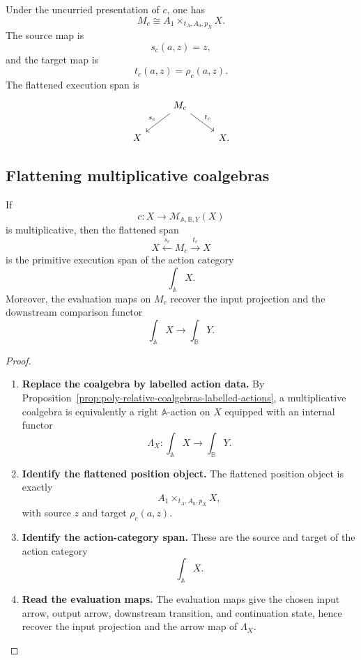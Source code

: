 Under the uncurried presentation of \(c\), one has
\[
M_c\cong A_1\times_{t_A,A_0,p_X}X.
\]
The source map is
\[
s_c(a,z)=z,
\]
and the target map is
\[
t_c(a,z)=\rho_c(a,z).
\]
The flattened execution span is
\[
\begin{tikzcd}
&
M_c
  \arrow[dl,"s_c"']
  \arrow[dr,"t_c"]
&
\\
X && X .
\end{tikzcd}
\]

\subsection{Flattening multiplicative coalgebras}
\label{subsec:poly-relative-flattening-multiplicative}

\begin{theorem}
\label{thm:poly-relative-flattening-multiplicative}
If
\[
c:X\to\mathcal M_{\mathbb A,\mathbb B,Y}(X)
\]
is multiplicative, then the flattened span
\[
X\xleftarrow{s_c}M_c\xrightarrow{t_c}X
\]
is the primitive execution span of the action category
\[
\int_{\mathbb A}X.
\]
Moreover, the evaluation maps on \(M_c\) recover the input projection and the
downstream comparison functor
\[
\int_{\mathbb A}X\to\int_{\mathbb B}Y.
\]
\end{theorem}

\begin{proof}
\leavevmode
\begin{enumerate}
\item \textbf{Replace the coalgebra by labelled action data.}
By Proposition~\ref{prop:poly-relative-coalgebras-labelled-actions}, a
multiplicative coalgebra is equivalently a right \(\mathbb A\)-action on
\(X\) equipped with an internal functor
\[
\Lambda_X:\int_{\mathbb A}X\to\int_{\mathbb B}Y.
\]

\item \textbf{Identify the flattened position object.}
The flattened position object is exactly
\[
A_1\times_{t_A,A_0,p_X}X,
\]
with source \(z\) and target \(\rho_c(a,z)\).

\item \textbf{Identify the action-category span.}
These are the source and target of the action category
\[
\int_{\mathbb A}X.
\]

\item \textbf{Read the evaluation maps.}
The evaluation maps give the chosen input arrow, output arrow, downstream
transition, and continuation state, hence recover the input projection and the
arrow map of \(\Lambda_X\).
\end{enumerate}
\end{proof}

